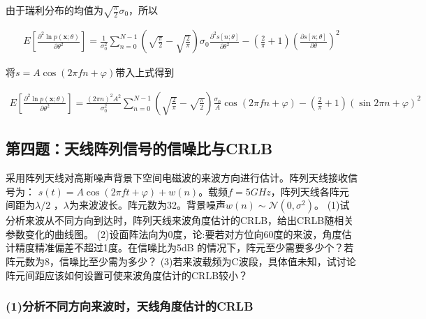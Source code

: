 \documentclass[fontset=windows]{article}
\numberwithin{figure}{section}
\begin{document}
由于瑞利分布的均值为\(\sqrt{\frac{\pi}{2}}\sigma_0\)，所以

\begin{align*}
	E\left[\frac{\partial^2 \ln p(\mathbf{x};\theta)}{\partial \theta^2}\right]
	=\frac{1}{\sigma_0^2}\sum_{n=0}^{N-1}(\sqrt{\frac{\pi}{2}}-\sqrt{\frac{2}{\pi}})\sigma_0
	\frac{\partial^2 s[n;\theta]}{\partial \theta^2}
	-(\frac{2}{\pi}+1)\left(\frac{\partial s[n;\theta]}{\partial \theta}\right)^2
\end{align*}

将\(s=A\cos (2\pi fn+\varphi)\)带入上式得到

\begin{align*}
	E\left[\frac{\partial^2 \ln p(\mathbf{x};\theta)}{\partial \theta^2}\right]
	=\frac{(2\pi n)^2A^2}{\sigma_0^2}\sum_{n=0}^{N-1}(\sqrt{\frac{2}{\pi}}-
	\sqrt{\frac{\pi}{2}})\frac{\sigma_0}{A}\cos (2\pi fn+\varphi)
	-(\frac{2}{\pi}+1)(\sin 2\pi n+\varphi)^2
\end{align*}

\subsection{第四题：天线阵列信号的信噪比与CRLB}
采用阵列天线对高斯噪声背景下空间电磁波的来波方向进行估计。阵列天线接收信号为：
\(s(t)=A\cos (2\pi ft+\varphi)+w(n)\)。载频\(f=5GHz\)，阵列天线各阵元间距为\(\lambda/2\)
，\(\lambda\)为来波波长。阵元数为32。背景噪声\(w(n)\sim \mathcal{N} (0,\sigma^2)\)。
(1)试分析来波从不同方向到达时，阵列天线来波角度估计的CRLB，给出CRLB随相关参数变化的曲线图。
(2)设面阵法向为0度，论:要若对方位向60度的来波，角度估计精度精准偏差不超过1度。在信噪比为5dB
的情况下，阵元至少需要多少个？若阵元数为8，信噪比至少需为多少？
(3)若来波载频为C波段，具体值未知，试讨论阵元间距应该如何设置可使来波角度估计的CRLB较小？

\subsubsection*{(1)分析不同方向来波时，天线角度估计的CRLB}
\end{document}

